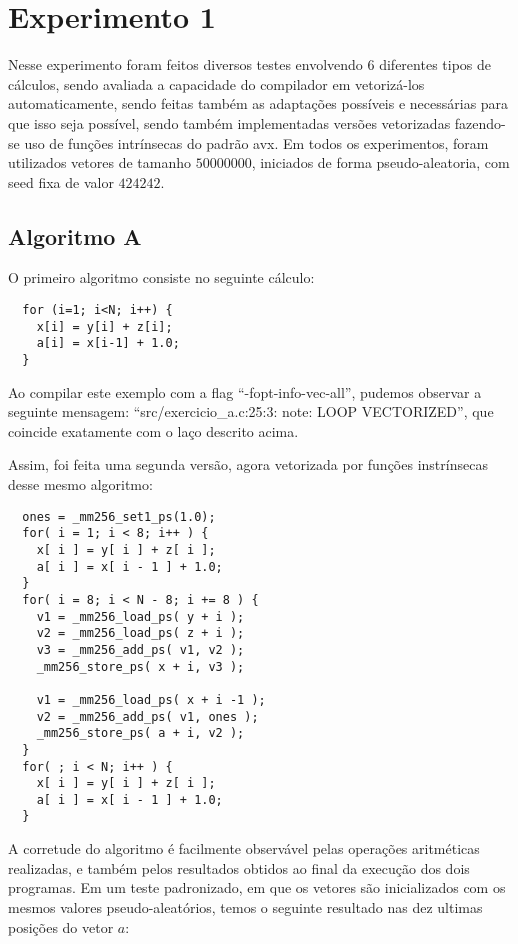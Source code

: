 \documentclass[conference]{IEEEtran}
\begin{document}
\section{Experimento 1}
Nesse experimento foram feitos diversos testes envolvendo 6 diferentes tipos de cálculos, sendo avaliada a capacidade do compilador em vetorizá-los automaticamente, sendo feitas também as adaptações possíveis e necessárias para que isso seja possível, sendo também implementadas versões vetorizadas fazendo-se uso de funções intrínsecas do padrão avx. Em todos os experimentos, foram utilizados vetores de tamanho $50000000$, iniciados de forma pseudo-aleatoria, com seed fixa de valor $424242$.

\subsection{Algoritmo A}
O primeiro algoritmo consiste no seguinte cálculo:

\begin{lstlisting}
  for (i=1; i<N; i++) {
    x[i] = y[i] + z[i];
    a[i] = x[i-1] + 1.0;
  }
\end{lstlisting}

Ao compilar este exemplo com a flag ``-fopt-info-vec-all'', pudemos observar a seguinte mensagem: ``src/exercicio\_a.c:25:3: note: LOOP VECTORIZED'', que coincide exatamente com o laço descrito acima.

Assim, foi feita uma segunda versão, agora vetorizada por funções instrínsecas desse mesmo algoritmo:

\begin{lstlisting}
  ones = _mm256_set1_ps(1.0);
  for( i = 1; i < 8; i++ ) {
    x[ i ] = y[ i ] + z[ i ];
    a[ i ] = x[ i - 1 ] + 1.0;
  }
  for( i = 8; i < N - 8; i += 8 ) {
    v1 = _mm256_load_ps( y + i );
    v2 = _mm256_load_ps( z + i );
    v3 = _mm256_add_ps( v1, v2 );
    _mm256_store_ps( x + i, v3 );

    v1 = _mm256_load_ps( x + i -1 );
    v2 = _mm256_add_ps( v1, ones );
    _mm256_store_ps( a + i, v2 );
  }
  for( ; i < N; i++ ) {
    x[ i ] = y[ i ] + z[ i ];
    a[ i ] = x[ i - 1 ] + 1.0;
  }
\end{lstlisting}

A corretude do algoritmo é facilmente observável pelas operações aritméticas realizadas, e também pelos resultados obtidos ao final da execução dos dois programas.
Em um teste padronizado, em que os vetores são inicializados com os mesmos valores pseudo-aleatórios, temos o seguinte resultado nas dez ultimas posições do vetor $a$: %
\end{document}

